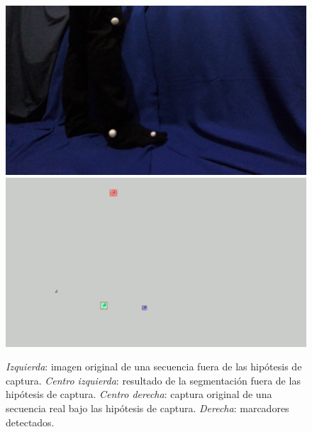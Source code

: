 \begin{figure}[ht!]
        {\includegraphics[scale=0.07]{imagenes/orig.png}\label{abelvideo2}}\hspace{1 mm}
        {\includegraphics[scale=0.07]{imagenes/detect.png}
        \label{abeldetect}}
      \caption{%
       \textit{Izquierda}: imagen original de una secuencia fuera de las hipótesis de captura. 
       \textit{Centro izquierda}: resultado de la segmentación fuera de las hipótesis de captura.
       \textit{Centro derecha}: captura original de una secuencia real bajo las hipótesis de captura.
       \textit{Derecha}: marcadores detectados.}  
      \label{ejemploabelumbr2}
\end{figure}
\vspace{-0.6cm}